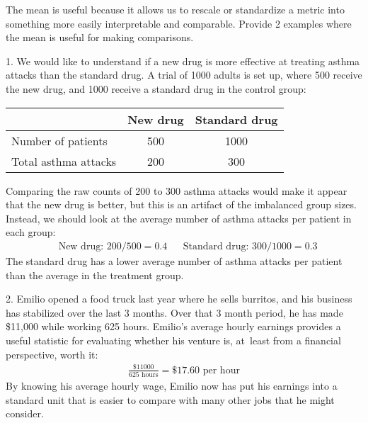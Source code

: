 \begin{examplewrap}
\begin{nexample}{The mean is useful because it allows us to
    rescale or standardize a metric into something more easily
    interpretable and comparable.
    Provide 2 examples where the mean
    is useful for making comparisons.}

  1. We would like to understand if a new drug is more
  effective at treating asthma attacks than the standard drug.
  A trial of 1000 adults is set up, where 500 receive the new
  drug, and 1000 receive a standard drug in the control
  group:\vspace{-2mm}
  \begin{center}
  \begin{tabular}{l cc}
  &           New drug & Standard drug \\
  \hline
  Number of patients   & 500 & 1000 \\
  Total asthma attacks & 200 & 300 \\
  \hline
  \end{tabular}
  \end{center}
  Comparing the raw counts of 200 to 300 asthma attacks
  would make it appear that the new drug is better,
  but this is an artifact of the imbalanced group sizes.
  Instead, we should look at the average number of asthma
  attacks per patient in each group:
  \begin{align*}
  & \text{New drug: } 200 / 500 = 0.4 %
  && \text{Standard drug: } 300 / 1000 = 0.3
  \end{align*}
  The standard drug has a lower average number of asthma
  attacks per patient than the average in the treatment group.

  2. Emilio opened a food truck last year where he sells burritos,
  and his business has stabilized over the last 3 months.
  Over that 3 month period, he has made \$11,000 while
  working 625 hours.
  Emilio's average hourly earnings provides
  a useful statistic for evaluating whether his venture is,
  at~least from a financial perspective, worth it:
  \begin{align*}
  \frac{\$11000}{625\text{ hours}} = \$17.60\text{ per hour}
  \end{align*}
  By knowing his average hourly wage,
  Emilio now has put his earnings into a standard unit that
  is easier to compare with many other jobs that he might
  consider.
\end{nexample}
\end{examplewrap}

